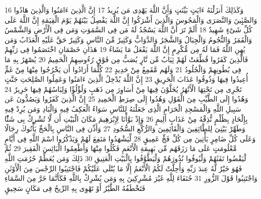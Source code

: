 \documentclass[20pt,a4paper]{article}
\begin{document}
{\tiny\colorbox{cl_aya}{16}} وَكَذَلِكَ أَنزَلْنَهُ ءَايَتٍ بَيِّنَتٍ وَأَنَّ اللَّهَ يَهْدِى مَن يُرِيدُ
{\tiny\colorbox{cl_aya}{17}} إِنَّ الَّذِينَ ءَامَنُوا وَالَّذِينَ هَادُوا وَالصَّبِِٔينَ وَالنَّصَرَى وَالْمَجُوسَ وَالَّذِينَ أَشْرَكُوا إِنَّ اللَّهَ يَفْصِلُ بَيْنَهُمْ يَوْمَ الْقِيَمَةِ إِنَّ اللَّهَ عَلَى كُلِّ شَىْءٍ شَهِيدٌ
{\tiny\colorbox{cl_aya}{18}} أَلَمْ تَرَ أَنَّ اللَّهَ يَسْجُدُ لَهُ مَن فِى السَّمَوَتِ وَمَن فِى الْأَرْضِ وَالشَّمْسُ وَالْقَمَرُ وَالنُّجُومُ وَالْجِبَالُ وَالشَّجَرُ وَالدَّوَابُّ وَكَثِيرٌ مِّنَ النَّاسِ وَكَثِيرٌ حَقَّ عَلَيْهِ الْعَذَابُ وَمَن يُهِنِ اللَّهُ فَمَا لَهُ مِن مُّكْرِمٍ إِنَّ اللَّهَ يَفْعَلُ مَا يَشَاءُ
{\tiny\colorbox{cl_aya}{19}} هَذَانِ خَصْمَانِ اخْتَصَمُوا فِى رَبِّهِمْ فَالَّذِينَ كَفَرُوا قُطِّعَتْ لَهُمْ ثِيَابٌ مِّن نَّارٍ يُصَبُّ مِن فَوْقِ رُءُوسِهِمُ الْحَمِيمُ
{\tiny\colorbox{cl_aya}{20}} يُصْهَرُ بِهِ مَا فِى بُطُونِهِمْ وَالْجُلُودُ
{\tiny\colorbox{cl_aya}{21}} وَلَهُم مَّقَمِعُ مِنْ حَدِيدٍ
{\tiny\colorbox{cl_aya}{22}} كُلَّمَا أَرَادُوا أَن يَخْرُجُوا مِنْهَا مِنْ غَمٍّ أُعِيدُوا فِيهَا وَذُوقُوا عَذَابَ الْحَرِيقِ
{\tiny\colorbox{cl_aya}{23}} إِنَّ اللَّهَ يُدْخِلُ الَّذِينَ ءَامَنُوا وَعَمِلُوا الصَّلِحَتِ جَنَّتٍ تَجْرِى مِن تَحْتِهَا الْأَنْهَرُ يُحَلَّوْنَ فِيهَا مِنْ أَسَاوِرَ مِن ذَهَبٍ وَلُؤْلُؤًا وَلِبَاسُهُمْ فِيهَا حَرِيرٌ
{\tiny\colorbox{cl_aya}{24}} وَهُدُوا إِلَى الطَّيِّبِ مِنَ الْقَوْلِ وَهُدُوا إِلَى صِرَطِ الْحَمِيدِ
{\tiny\colorbox{cl_aya}{25}} إِنَّ الَّذِينَ كَفَرُوا وَيَصُدُّونَ عَن سَبِيلِ اللَّهِ وَالْمَسْجِدِ الْحَرَامِ الَّذِى جَعَلْنَهُ لِلنَّاسِ سَوَاءً الْعَكِفُ فِيهِ وَالْبَادِ وَمَن يُرِدْ فِيهِ بِإِلْحَادٍ بِظُلْمٍ نُّذِقْهُ مِنْ عَذَابٍ أَلِيمٍ
{\tiny\colorbox{cl_aya}{26}} وَإِذْ بَوَّأْنَا لِإِبْرَهِيمَ مَكَانَ الْبَيْتِ أَن لَّا تُشْرِكْ بِى شَئًْا وَطَهِّرْ بَيْتِىَ لِلطَّائِفِينَ وَالْقَائِمِينَ وَالرُّكَّعِ السُّجُودِ
{\tiny\colorbox{cl_aya}{27}} وَأَذِّن فِى النَّاسِ بِالْحَجِّ يَأْتُوكَ رِجَالًا وَعَلَى كُلِّ ضَامِرٍ يَأْتِينَ مِن كُلِّ فَجٍّ عَمِيقٍ
{\tiny\colorbox{cl_aya}{28}} لِّيَشْهَدُوا مَنَفِعَ لَهُمْ وَيَذْكُرُوا اسْمَ اللَّهِ فِى أَيَّامٍ مَّعْلُومَتٍ عَلَى مَا رَزَقَهُم مِّن بَهِيمَةِ الْأَنْعَمِ فَكُلُوا مِنْهَا وَأَطْعِمُوا الْبَائِسَ الْفَقِيرَ
{\tiny\colorbox{cl_aya}{29}} ثُمَّ لْيَقْضُوا تَفَثَهُمْ وَلْيُوفُوا نُذُورَهُمْ وَلْيَطَّوَّفُوا بِالْبَيْتِ الْعَتِيقِ
{\tiny\colorbox{cl_aya}{30}} ذَلِكَ وَمَن يُعَظِّمْ حُرُمَتِ اللَّهِ فَهُوَ خَيْرٌ لَّهُ عِندَ رَبِّهِ وَأُحِلَّتْ لَكُمُ الْأَنْعَمُ إِلَّا مَا يُتْلَى عَلَيْكُمْ فَاجْتَنِبُوا الرِّجْسَ مِنَ الْأَوْثَنِ وَاجْتَنِبُوا قَوْلَ الزُّورِ
{\tiny\colorbox{cl_aya}{31}} حُنَفَاءَ لِلَّهِ غَيْرَ مُشْرِكِينَ بِهِ وَمَن يُشْرِكْ بِاللَّهِ فَكَأَنَّمَا خَرَّ مِنَ السَّمَاءِ فَتَخْطَفُهُ الطَّيْرُ أَوْ تَهْوِى بِهِ الرِّيحُ فِى مَكَانٍ سَحِيقٍ
\end{document}
